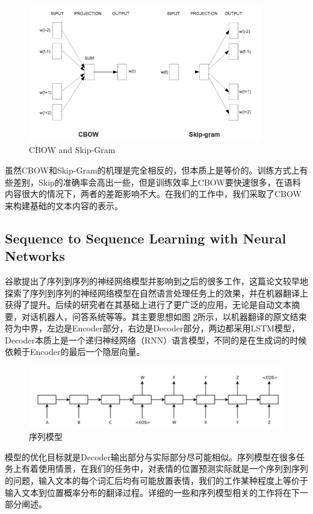 \documentclass[10pt, titlepage]{article}
\begin{document}
		\begin{figure}[htb]
				\centering
				\includegraphics[height=6cm]{figs/7.png}
				\caption{CBOW and Skip-Gram}
				\label{fig:cbowskip}
		\end{figure}

		虽然CBOW和Skip-Gram的机理是完全相反的，但本质上是等价的。训练方式上有些差别，Skip的准确率会高出一些，但是训练效率上CBOW要快速很多，在语料内容很大的情况下，两者的差距影响不大。在我们的工作中，我们采取了CBOW来构建基础的文本内容的表示。


	\subsection{Sequence to Sequence Learning with Neural Networks}
		谷歌\cite{sutskever2014sequence}提出了序列到序列的神经网络模型并影响到之后的很多工作，这篇论文较早地探索了序列到序列的神经网络模型在自然语言处理任务上的效果，并在机器翻译上获得了提升。后续的研究者在其基础上进行了更广泛的应用，无论是自动文本摘要，对话机器人，问答系统等等。其主要思想如图 \ref{fig:seq2seq}所示，以机器翻译的原文结束符为中界，左边是Encoder部分，右边是Decoder部分，两边都采用LSTM模型，Decoder本质上是一个递归神经网络（RNN）语言模型，不同的是在生成词的时候依赖于Encoder的最后一个隐层向量。
			\begin{figure}[htb]
				\centering
				\includegraphics[width=1\columnwidth]{figs/10.png}
				\caption{序列模型}
				\label{fig:seq2seq}
			\end{figure}
		模型的优化目标就是Decoder输出部分与实际部分尽可能相似。序列模型在很多任务上有着使用情景，在我们的任务中，对表情的位置预测实际就是一个序列到序列的问题，输入文本的每个词汇后均有可能放置表情，我们的工作某种程度上等价于输入文本到位置概率分布的翻译过程。详细的一些和序列模型相关的工作将在下一部分阐述。
\end{document}
